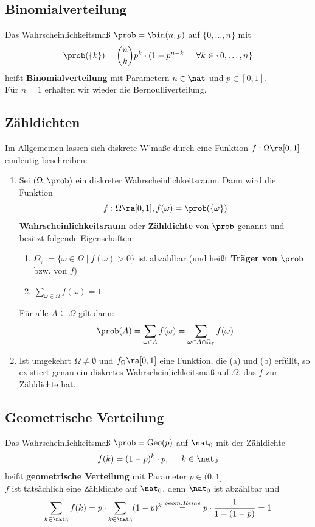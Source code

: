 \documentclass{kit}
\begin{document}
  \subsection{Binomialverteilung}
    Das Wahrscheinlichkeitsmaß $\prob=\bin(n,p)$ auf $\{0,\dots,n\}$ mit
    $$\prob(\{k\})=\binom{n}{k}p^k\cdot(1-p^{n-k}\hspace{0.5cm}\forall k\in\{0,\dots,n\}$$
    heißt \textbf{Binomialverteilung} mit Parametern $n\in\nat$ und $p\in[0,1]$.\\
    Für $n=1$ erhalten wir wieder die Bernoulliverteilung.
  \subsection{Zähldichten}
    Im Allgemeinen lassen sich diskrete W'maße durch eine Funktion $f:\Omega\ra[0,1]$ eindeutig beschreiben:
    \begin{enumerate}[label=\roman*)]
      \item Sei $(\Omega,\prob)$ ein diskreter Wahrscheinlichkeitsraum. Dann wird die Funktion
        $$f:\Omega\ra[0,1],f(\omega)=\prob(\{\omega\})$$
        \textbf{Wahrscheinlichkeitsraum} oder \textbf{Zähldichte} von $\prob$ genannt und besitzt folgende Eigenschaften:
        \begin{enumerate}
          \item $\Omega_{\tau}:=\{\omega\in\Omega\mid f(\omega)>0\}$ ist abzählbar (und heißt \textbf{Träger von $\prob$}
            bzw. von $f$)
          \item $\sum_{\omega\in\Omega}f(\omega)=1$
        \end{enumerate}
        Für alle $A\subseteq\Omega$ gilt dann:
        $$\prob(A)=\sum_{\omega\in A}f(\omega)=\sum_{\omega\in A\cap\Omega_{\tau}}f(\omega)$$
      \item Ist umgekehrt $\Omega\neq\emptyset$ und $f_\Omega\ra[0,1]$ eine Funktion, die (a) und (b) erfüllt, so existiert
        genau ein diskretes Wahrscheinlichkeitsmaß auf $\Omega$, das $f$ zur Zähldichte hat.
    \end{enumerate}
  \subsection{Geometrische Verteilung}
    Das Wahrscheinlichkeitsmaß $\prob=\text{Geo}(p)$ auf $\nat_0$ mit der Zähldichte
    $$f(k)=(1-p)^k\cdot p,\hspace{0.5cm}k\in\nat_0$$
    heißt \textbf{geometrische Verteilung} mit Parameter $p\in(0,1]$\\
    $f$ ist tatsächlich eine Zähldichte auf $\nat_0$, denn $\nat_0$ ist abzählbar und
    $$\sum_{k\in\nat_0}f(k)=p\cdot\sum_{k\in\nat_0}(1-p)^k\stackrel{geom. Reihe}{=}p\cdot\frac{1}{1-(1-p)}=1$$
\end{document}
